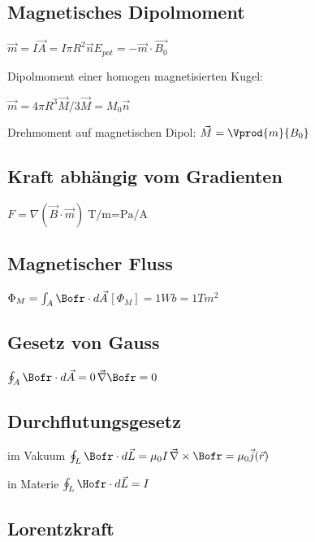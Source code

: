 \documentclass[10pt,a4paper]{scrartcl}
\begin{document}
\begin{multicols*}{3}
	\subsection{Magnetisches Dipolmoment}

	$\vec{m}=I\vec{A}=I\pi R^2\vec{n}$\hfill$E_{pot}=-\vec{m}\cdot\vec{B_0}$
	
	Dipolmoment einer homogen magnetisierten Kugel:
	
	$\vec{m}=4\pi R^3\vec{M}/3$\hfill$\vec{M}=M_0\vec{n}$
	
	Drehmoment auf magnetischen Dipol: \hspace{1ex} $\vec{M}=\Vprod{m}{B_0}$
		
	\subsection*{Kraft abhängig vom Gradienten}
	
	$F=\nabla(\vec{B}\cdot\vec{m})$\hfill$\si{\tesla\per\meter}=\si{\pascal\per\ampere}$ 	
	
	\subsection{Magnetischer Fluss}
	
	$\Phi_M=\int_A{\Bofr\cdot d\vec{A}}$\hfill$[\Phi_M]=1 Wb=1Tm^2$

	\subsection{Gesetz von Gauss}
	
	$\oint_A{\Bofr\cdot d\vec{A}}= 0$\hfill$\vec{\nabla}\Bofr=0$	
	\subsection{Durchflutungsgesetz}
	im Vakuum \hspace{1ex}$\oint_L{\Bofr\cdot d\vec{L}}=\mu_0 I$\hfill$\vec{\nabla}\times\Bofr=\mu_0\vec{j}(\vec{r})$
	
	in Materie \hspace{1ex}$\oint_L{\Hofr\cdot d\vec{L}}=I$
	
	
	\subsection{Lorentzkraft}
	

\end{multicols*}
\end{document}
